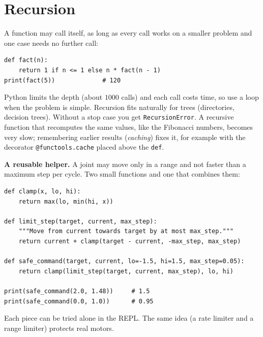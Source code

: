 \section*{Recursion}
A function may call itself, as long as every call works on a smaller problem and one case needs no further call:
\begin{verbatim}
def fact(n):
    return 1 if n <= 1 else n * fact(n - 1)
print(fact(5))             # 120
\end{verbatim}
Python limits the depth (about $1000$ calls) and each call costs time, so use a loop when the problem is simple. Recursion fits naturally for trees (directories, decision trees). Without a stop case you get \texttt{RecursionError}. A recursive function that recomputes the same values, like the Fibonacci numbers, becomes very slow; remembering earlier results (\emph{caching}) fixes it, for example with the decorator \texttt{@functools.cache} placed above the \texttt{def}.

\begin{example}
\textbf{A reusable helper.} A joint may move only in a range and not faster than a maximum step per cycle. Two small functions and one that combines them:
\begin{verbatim}
def clamp(x, lo, hi):
    return max(lo, min(hi, x))

def limit_step(target, current, max_step):
    """Move from current towards target by at most max_step."""
    return current + clamp(target - current, -max_step, max_step)

def safe_command(target, current, lo=-1.5, hi=1.5, max_step=0.05):
    return clamp(limit_step(target, current, max_step), lo, hi)

print(safe_command(2.0, 1.48))     # 1.5
print(safe_command(0.0, 1.0))      # 0.95
\end{verbatim}
Each piece can be tried alone in the REPL. The same idea (a rate limiter and a range limiter) protects real motors.
\end{example}

